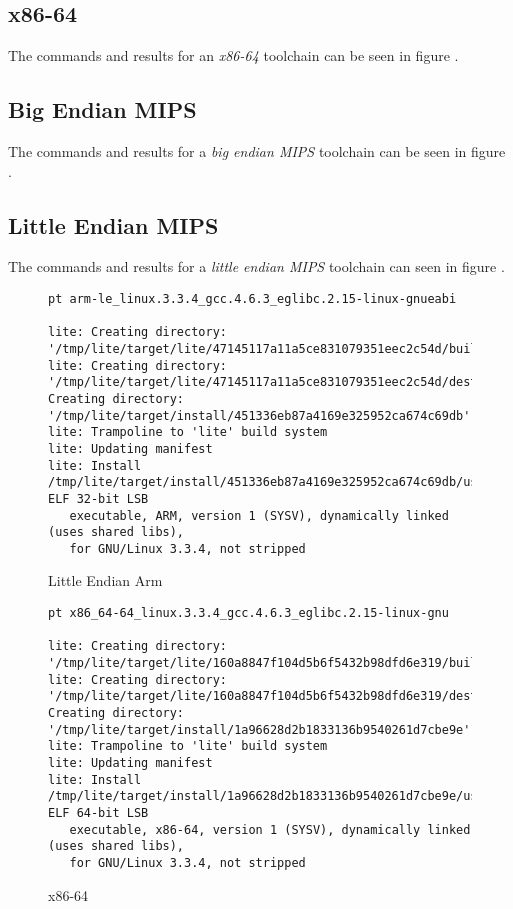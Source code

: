 \subsection{x86-64}

The commands and results for an \emph{x86-64} toolchain can be seen in
figure .

\subsection{Big Endian MIPS}
The commands and results for a \emph{big endian MIPS} toolchain can be
seen in figure .

\subsection{Little Endian MIPS}

The commands and results for a \emph{little endian MIPS} toolchain can
seen in figure .

\begin{landscape}
\begin{figure}
\hrulefill
\begin{verbatim}
pt arm-le_linux.3.3.4_gcc.4.6.3_eglibc.2.15-linux-gnueabi

lite: Creating directory: '/tmp/lite/target/lite/47145117a11a5ce831079351eec2c54d/build'
lite: Creating directory: '/tmp/lite/target/lite/47145117a11a5ce831079351eec2c54d/destdir'
Creating directory: '/tmp/lite/target/install/451336eb87a4169e325952ca674c69db'
lite: Trampoline to 'lite' build system
lite: Updating manifest
lite: Install
/tmp/lite/target/install/451336eb87a4169e325952ca674c69db/usr/bin/lite: ELF 32-bit LSB
   executable, ARM, version 1 (SYSV), dynamically linked (uses shared libs),
   for GNU/Linux 3.3.4, not stripped
\end{verbatim}
\caption{Little Endian Arm}\label{toolchain-usage:le-arm}
\hrulefill
\end{figure}

\begin{figure}
\hrulefill
\begin{verbatim}
pt x86_64-64_linux.3.3.4_gcc.4.6.3_eglibc.2.15-linux-gnu

lite: Creating directory: '/tmp/lite/target/lite/160a8847f104d5b6f5432b98dfd6e319/build'
lite: Creating directory: '/tmp/lite/target/lite/160a8847f104d5b6f5432b98dfd6e319/destdir'
Creating directory: '/tmp/lite/target/install/1a96628d2b1833136b9540261d7cbe9e'
lite: Trampoline to 'lite' build system
lite: Updating manifest
lite: Install
/tmp/lite/target/install/1a96628d2b1833136b9540261d7cbe9e/usr/bin/lite: ELF 64-bit LSB
   executable, x86-64, version 1 (SYSV), dynamically linked (uses shared libs),
   for GNU/Linux 3.3.4, not stripped
\end{verbatim}
\caption{x86-64}\label{toolchain-usage:x86-64}
\hrulefill
\end{figure}
\end{landscape}

